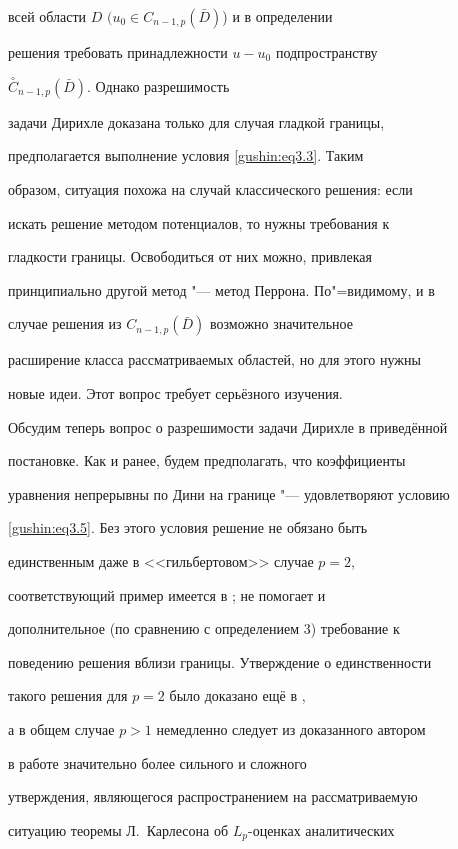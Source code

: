 всей области $D$ $(u_0 \in C_{n-1, p}(\bar{D}) $) и в определении

решения требовать принадлежности $ u - u_0$ подпространству

${\stackrel{\circ}{C}}_{n-1, p}(\bar{D})$. Однако разрешимость

задачи Дирихле доказана только для случая гладкой границы,

предполагается выполнение условия \eqref{gushin:eq3.3}. Таким

образом, ситуация похожа на случай классического решения: если

искать решение методом потенциалов, то нужны требования к

гладкости границы. Освободиться от них можно, привлекая

принципиально другой метод "--- метод Перрона. По"=видимому, и в

случае решения из $C_{n-1, p}(\bar{D})$ возможно значительное

расширение класса рассматриваемых областей, но для этого нужны

новые идеи. Этот вопрос требует серьёзного изучения.



Обсудим теперь вопрос о разрешимости задачи Дирихле в приведённой

постановке. Как и ранее, будем предполагать, что коэффициенты

уравнения непрерывны по Дини на границе "--- удовлетворяют условию

\eqref{gushin:eq3.5}. Без этого условия решение не обязано быть

единственным даже в <<гильбертовом>> случае $p = 2$,

соответствующий пример имеется в \cite{gushin:G88}; не помогает и

дополнительное (по сравнению с определением 3) требование к

поведению решения вблизи границы. Утверждение о единственности

такого решения для ${p = 2}$ было доказано ещё  в \cite{gushin:G88},

а в общем случае $p > 1$ немедленно следует из доказанного автором

в работе \cite{gushin:G13} значительно более сильного и сложного

утверждения, являющегося распространением на рассматриваемую

ситуацию теоремы Л.~Карлесона об $L_p$-оценках аналитических

